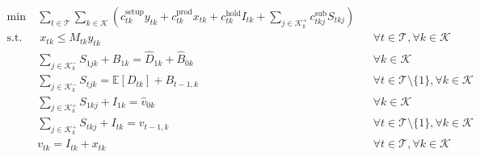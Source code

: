 \documentclass[11pt]{article}
\newcommand{\ti}{t} %
\newcommand{\TI}{\mathcal{T}}
\newcommand{\ka}{k} %
\newcommand{\KA}{\mathcal{K}}
\newcommand{\jey}{j} %
\newcommand{\Vi}{v} %
\newcommand{\Csub}{\mathcal{K}^+_k}
\newcommand{\Psub}{\mathcal{K}^-_k}
\begin{document}
 
\begin{subequations}
\label{mod:Det}

\begin{alignat}{2}
\min \ & \sum_{\ti \in \TI} \sum_{\ka \in \KA} \left( c^{\text{setup}}_{\ti \ka}y_{\ti \ka} + c^{\text{prod}}_{\ti \ka}x_{\ti \ka}+ c^{\text{hold}}_{\ti \ka}I_{\ti \ka} +\sum_{\jey \in  \Csub}c^{\text{sub}}_{\ti \ka \jey} S_{\ti \ka \jey}  \right) 
& \label{eq:Sub_Det_obj} \\
\text{s.t.} \ & \  x_{\ti \ka} \leq M_{\ti \ka} y_{\ti \ka} &&  \forall \ti  \in \TI, \forall \ka \in \KA  \label{eq:Sub_Det_Setup}\\
  &  \sum_{\jey \in  \Psub} {S}_{1  \jey \ka} + B_{1 \ka}  = \hat{D}_{1 \ka} + \hat{B}_{0\ka} &&\forall \ka\in \KA       \label{eq:Det_inventory_1}\\
 &  \sum_{\jey \in  \Psub} {S}_{\ti \jey \ka}  = \mathbb{E}[{D}_{\ti \ka}] + {B}_{\ti-1 , \ka} &&\forall \ti \in \TI \setminus\{1\},\forall \ka\in \KA      \label{eq:Det_inventory_2} \\
&  \sum_{\jey \in  \Csub} {S}_{1 \ka \jey} + I_{ 1 \ka} = \hat{\Vi}_{0\ka} &&\forall \ka \in \KA       \label{eq:Det_inventory_3}\\
&  \sum_{\jey \in  \Csub} {S}_{\ti \ka \jey} + I_{\ti \ka} = \Vi_{\ti-1 , \ka} &&\forall \ti  \in \TI \setminus\{1\},\forall \ka \in \KA       \label{eq:Det_inventory_4}\\
& v_{\ti \ka} = I_{\ti \ka} + x_{\ti \ka}  \quad &&\forall \ti  \in \TI,\forall \ka \in \KA  \label{eq:Det_inventory_5} \\

\end{alignat}
\end{subequations}
\end{document}

